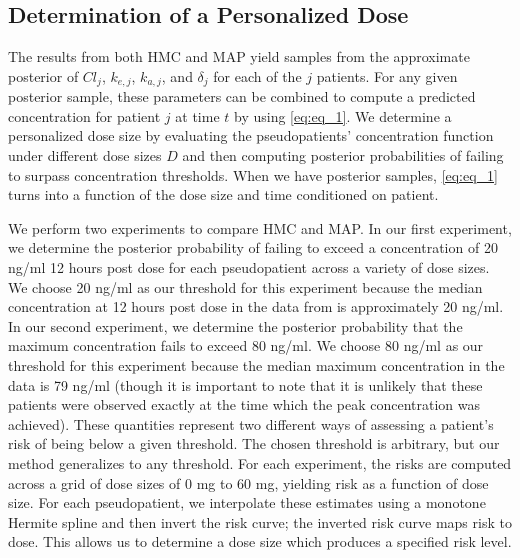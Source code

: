 \subsection*{Determination of a Personalized Dose}

The results from both  HMC and MAP yield samples from the approximate posterior of $\mathit{Cl}_{j}$, $k_{e,j}$, $k_{a,j}$, and $\delta_j$ for each of the $j$ patients.  For any given posterior sample, these parameters can be combined to compute a predicted concentration for patient $j$ at time $t$ by using \cref{eq:eq_1}.   We determine a personalized dose size by evaluating the pseudopatients’ concentration function under different dose sizes $D$ and then computing posterior probabilities of failing to surpass concentration thresholds.  When we have posterior samples, \cref{eq:eq_1} turns into a function of the dose size and time conditioned on patient. 


We perform two experiments to compare HMC and MAP.  In our first experiment, we determine the posterior probability of failing to exceed a concentration of 20 ng/ml 12 hours post dose for each pseudopatient across a variety of dose sizes. We choose 20 ng/ml as our threshold for this experiment because the median concentration at 12 hours post dose  in the data from \cite{Beaton2018-el} is approximately 20 ng/ml. In our second experiment, we determine the posterior probability that the maximum concentration fails to exceed 80 ng/ml.  We choose 80 ng/ml as our threshold for this experiment because the median maximum concentration in the data is 79 ng/ml (though it is important to note that it is unlikely that these patients were observed exactly at the time which the peak concentration was achieved).  These quantities represent two different ways of assessing a patient's risk of being below a given threshold.  The chosen threshold is arbitrary, but our method generalizes to any threshold.  For each experiment, the risks are computed across a grid of dose sizes of 0 mg to 60 mg, yielding risk as a function of dose size.  For each pseudopatient, we interpolate these estimates using a monotone Hermite spline and then invert the risk curve; the inverted risk curve maps risk to dose. This allows us to determine a dose size which produces a specified risk level.


